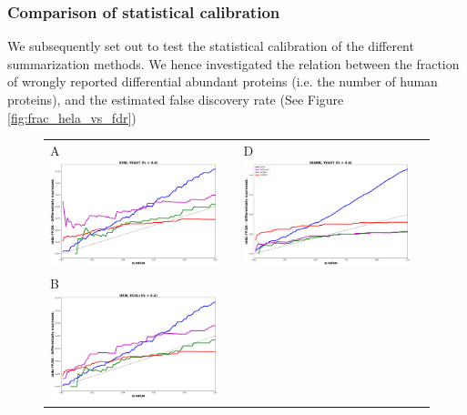 \documentclass[10pt,letterpaper]{article}
\begin{document}
\subsubsection*{Comparison of statistical calibration}

We subsequently set out to test the statistical calibration of the different summarization methods. We hence investigated the relation between the fraction of wrongly reported differential abundant proteins (i.e. the number of human proteins), and the estimated false discovery rate (See Figure \ref{fig:frac_hela_vs_fdr})
\begin{figure}[hbt]
    \centering
    \centering
    \begin{tabular}{lclc} 
        A \includegraphics[width=0.5\linewidth]{../../result/report_plots/osw_FP_DE_yeast.png} & &%
        D \includegraphics[width=0.5\linewidth]{../../result/report_plots/diann_FP_DE_yeast.png} & \\%
        B \includegraphics[width=0.5\linewidth]{../../result/report_plots/osw_FP_DE_ecoli.png} & &%

\end{tabular}
\end{figure}
\end{document}
